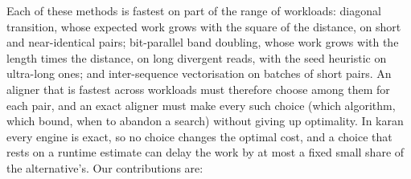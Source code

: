 Each of these methods is fastest on part of the range of workloads: diagonal transition, whose expected work grows with the square of the distance, on short and near-identical pairs; bit-parallel band doubling, whose work grows with the length times the distance, on long divergent reads, with the seed heuristic on ultra-long ones; and inter-sequence vectorisation on batches of short pairs. An aligner that is fastest across workloads must therefore choose among them for each pair, and an exact aligner must make every such choice (which algorithm, which bound, when to abandon a search) without giving up optimality. In karan every engine is exact, so no choice changes the optimal cost, and a choice that rests on a runtime estimate can delay the work by at most a fixed small share of the alternative's. Our contributions are:

